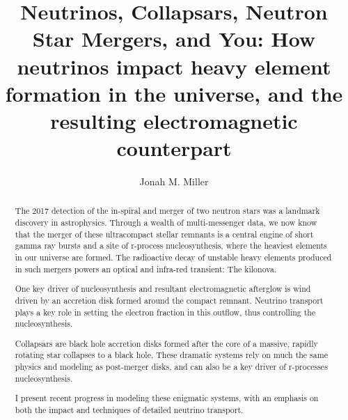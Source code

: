 \documentclass[letter,nofootinbib,superscriptaddress,twocolumn]{revtex4-1}
\begin{document}
\title{Neutrinos, Collapsars, Neutron Star Mergers, and You: How neutrinos impact heavy element formation in the universe, and the resulting electromagnetic counterpart}

\author{Jonah M. Miller}

\begin{abstract}

  The 2017 detection of the in-spiral and merger of two neutron stars
  was a landmark discovery in astrophysics. Through a wealth of
  multi-messenger data, we now know that the merger of these
  ultracompact stellar remnants is a central engine of short gamma ray
  bursts and a site of r-process nucleosynthesis, where the heaviest
  elements in our universe are formed. The radioactive decay of
  unstable heavy elements produced in such mergers powers an optical
  and infra-red transient: The kilonova.

  One key driver of nucleosynthesis and resultant electromagnetic
  afterglow is wind driven by an accretion disk formed around the
  compact remnant. Neutrino transport plays a key role in setting the
  electron fraction in this outflow, thus controlling the
  nucleosynthesis.

  Collapsars are black hole accretion disks formed after the core of a
  massive, rapidly rotating star collapses to a black hole. These
  dramatic systems rely on much the same physics and modeling as
  post-merger disks, and can also be a key driver of r-processes
  nucleosynthesis.

  I present recent progress in modeling these enigmatic systems, with
  an emphasis on both the impact and techniques of detailed neutrino
  transport.

\end{abstract}

\maketitle
\end{document}
